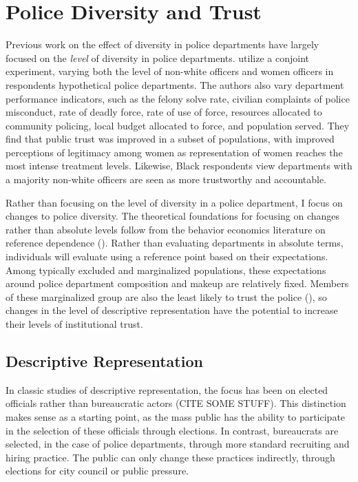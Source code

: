\documentclass[12pt]{article}
\begin{document}
\section{Police Diversity and Trust}

Previous work on the effect of diversity in police departments have largely focused on the \textit{level} of diversity in police departments. \cite{stauffer2023police} utilize a conjoint experiment, varying both the level of non-white officers and women officers in respondents hypothetical police departments. The authors also vary department performance indicators, such as the felony solve rate, civilian complaints of police misconduct, rate of deadly force, rate of use of force, resources allocated to community policing, local budget allocated to force, and population served. They find that public trust was improved in a subset of populations, with improved perceptions of legitimacy among women as representation of women reaches the most intense treatment levels. Likewise, Black respondents view departments with a majority non-white officers are seen as more trustworthy and accountable.

Rather than focusing on the level of diversity in a police department, I focus on changes to police diversity. The theoretical foundations for focusing on changes rather than absolute levels follow from the behavior economics literature on reference dependence (\cite{kHoszegi2006model}). Rather than evaluating departments in absolute terms, individuals will evaluate using a reference point based on their expectations. Among typically excluded and marginalized populations, these expectations around police department composition and makeup are relatively fixed. Members of these marginalized group are also the least likely to trust the police (\cite{stauffer2023police}), so changes in the level of descriptive representation have the potential to increase their levels of institutional trust.


\subsection{Descriptive Representation}
In classic studies of descriptive representation, the focus has been on elected officials rather than bureaucratic actors (CITE SOME STUFF). This distinction makes sense as a starting point, as the mass public has the ability to  participate in the selection of these officials through elections. In contrast, bureaucrats are selected, in the case of police departments, through more standard recruiting and hiring practice. The public can only change these practices indirectly, through elections for city council or public pressure.
\end{document}
